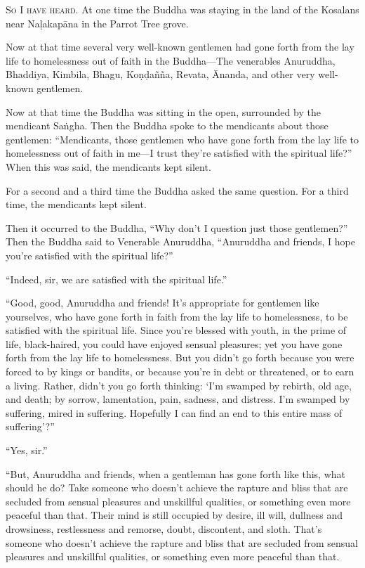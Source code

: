 \documentclass[12pt,openany]{book}%
\newcommand*{\scevam}[1]{\textsc{#1}}
\begin{document}
\scevam{So I have heard. }At one time the Buddha was staying in the land of the Kosalans near \textsanskrit{Naḷakapāna} in the Parrot Tree grove. 

Now at that time several very well-known gentlemen had gone forth from the lay life to homelessness out of faith in the Buddha—The venerables Anuruddha, Bhaddiya, Kimbila, Bhagu, \textsanskrit{Koṇḍañña}, Revata, Ānanda, and other very well-known gentlemen. 

Now at that time the Buddha was sitting in the open, surrounded by the mendicant \textsanskrit{Saṅgha}. Then the Buddha spoke to the mendicants about those gentlemen: “Mendicants, those gentlemen who have gone forth from the lay life to homelessness out of faith in me—I trust they’re satisfied with the spiritual life?” When this was said, the mendicants kept silent. 

For a second and a third time the Buddha asked the same question. For a third time, the mendicants kept silent. 

Then it occurred to the Buddha, “Why don’t I question just those gentlemen?” Then the Buddha said to Venerable Anuruddha, “Anuruddha and friends, I hope you’re satisfied with the spiritual life?” 

“Indeed, sir, we are satisfied with the spiritual life.” 

“Good, good, Anuruddha and friends! It’s appropriate for gentlemen like yourselves, who have gone forth in faith from the lay life to homelessness, to be satisfied with the spiritual life. Since you’re blessed with youth, in the prime of life, black-haired, you could have enjoyed sensual pleasures; yet you have gone forth from the lay life to homelessness. But you didn’t go forth because you were forced to by kings or bandits, or because you’re in debt or threatened, or to earn a living. Rather, didn’t you go forth thinking: ‘I’m swamped by rebirth, old age, and death; by sorrow, lamentation, pain, sadness, and distress. I’m swamped by suffering, mired in suffering. Hopefully I can find an end to this entire mass of suffering’?” 

“Yes, sir.” 

“But, Anuruddha and friends, when a gentleman has gone forth like this, what should he do? Take someone who doesn’t achieve the rapture and bliss that are secluded from sensual pleasures and unskillful qualities, or something even more peaceful than that. Their mind is still occupied by desire, ill will, dullness and drowsiness, restlessness and remorse, doubt, discontent, and sloth. That’s someone who doesn’t achieve the rapture and bliss that are secluded from sensual pleasures and unskillful qualities, or something even more peaceful than that. 
\end{document}

